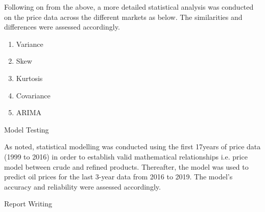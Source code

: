 \documentclass[12pt,twoside]{article}
\begin{document}
\begin{justify}
{\fontsize{11pt}{13.2pt}\selectfont Following on from the above, a more detailed statistical analysis was conducted on the price data across the different markets as below. The similarities and differences were assessed accordingly.\par}
\end{justify}\par

\begin{enumerate}
	\item Variance\par

	\item Skew\par

	\item Kurtosis\par

	\item Covariance\par

	\item ARIMA
\end{enumerate}\par

\begin{justify}
{\fontsize{11pt}{13.2pt}\selectfont \par}
\end{justify}
\vspace{\baselineskip}\begin{justify}
{\fontsize{11pt}{13.2pt}\selectfont Model Testing\par}
\end{justify}\par

\begin{justify}
{\fontsize{11pt}{13.2pt}\selectfont As noted, statistical modelling was conducted using the first 17years of price data (1999 to 2016) in order to establish valid mathematical relationships i.e. price model between crude and refined products. Thereafter, the model was used to predict oil prices for the last 3-year data from 2016 to 2019. The model’s accuracy and reliability were assessed accordingly.\par}
\end{justify}\par

\begin{justify}
{\fontsize{11pt}{13.2pt}\selectfont Report Writing\par}
\end{justify}\par
\end{document}
